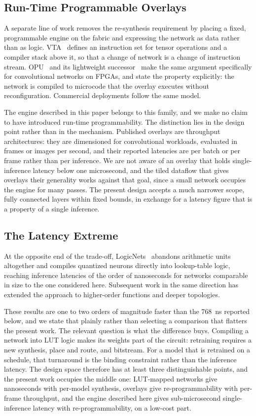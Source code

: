 \documentclass[final,5p,times,twocolumn]{elsarticle}
\begin{document}
\subsection{Run-Time Programmable Overlays}
\label{sec:overlays}
A separate line of work removes the re-synthesis requirement by placing a fixed,
programmable engine on the fabric and expressing the network as data rather than
as logic. VTA~\cite{Moreau2019} defines an instruction set for tensor operations
and a compiler stack above it, so that a change of network is a change of
instruction stream. OPU~\cite{Yu2020} and its lightweight
successor~\cite{YuLight2020} make the same argument specifically for
convolutional networks on FPGAs, and state the property explicitly: the network
is compiled to microcode that the overlay executes without reconfiguration.
Commercial deployments follow the same model.

The engine described in this paper belongs to this family, and we make no claim
to have introduced run-time programmability. The distinction lies in the design
point rather than in the mechanism. Published overlays are throughput
architectures: they are dimensioned for convolutional workloads, evaluated in
frames or images per second, and their reported latencies are per batch or per
frame rather than per inference. We are not aware of an overlay that holds
single-inference latency below one microsecond, and the tiled dataflow that
gives overlays their generality works against that goal, since a small network
occupies the engine for many passes. The present design accepts a much narrower
scope, fully connected layers within fixed bounds, in exchange for a latency
figure that is a property of a single inference.

\subsection{The Latency Extreme}
At the opposite end of the trade-off, LogicNets~\cite{Umuroglu2020} abandons
arithmetic units altogether and compiles quantized neurons directly into
lookup-table logic, reaching inference latencies of the order of nanoseconds for
networks comparable in size to the one considered here. Subsequent work in the
same direction has extended the approach to higher-order functions and deeper
topologies.

These results are one to two orders of magnitude faster than the
\SI{768}{\nano\second} reported below, and we state that plainly rather than
selecting a comparison that flatters the present work. The relevant question is
what the difference buys. Compiling a network into LUT logic makes its weights
part of the circuit: retraining requires a new synthesis, place and route, and
bitstream. For a model that is retrained on a schedule, that turnaround is the
binding constraint rather than the inference latency. The design space therefore
has at least three distinguishable points, and the present work occupies the
middle one: LUT-mapped networks give nanoseconds with per-model synthesis,
overlays give re-programmability with per-frame throughput, and the engine
described here gives sub-microsecond single-inference latency with
re-programmability, on a low-cost part.
\end{document}
